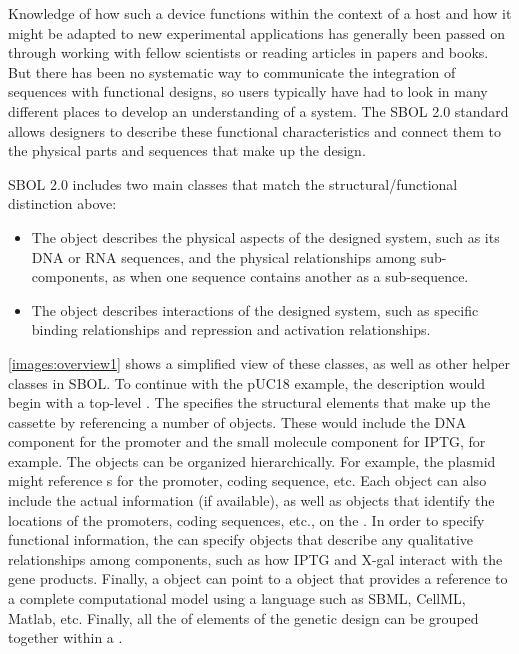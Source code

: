 Knowledge of how such a device functions within the context of a host and how it might be adapted to new experimental applications has generally been passed on through working with fellow scientists or reading articles in papers and books. 
But there has been no systematic way to communicate the integration of sequences with functional designs, so users typically have had to look in many different places to develop an understanding of a system.  
The SBOL 2.0 standard allows designers to describe these functional characteristics and connect them to the physical parts and sequences that make up the design. 

SBOL 2.0 includes two main classes that match the structural/functional distinction above:
\begin{itemize}
\item The  object describes the physical aspects of the designed system, such as its DNA or RNA sequences, and the physical relationships among sub-components, as when one sequence contains another as a sub-sequence.
\item The  object describes interactions of the designed system, such as specific binding relationships and repression and activation relationships. 
\end{itemize}

\ref{images:overview1} shows a simplified view of these classes, as well as other helper classes in SBOL. To continue with the pUC18 example, the description would begin with a top-level .  
The  specifies the structural elements that make up the cassette by referencing a number of  objects. These would include the DNA component for the promoter and the small molecule component for IPTG, for example.  
The  objects can be organized hierarchically.  
For example, the plasmid  might reference s for the promoter, coding sequence, etc.  
Each  object can also include the actual  information (if available), as well as  objects that identify the locations of the promoters, coding sequences, etc., on the .  
In order to specify functional information, the  can specify  objects that describe any qualitative relationships among components, such as how IPTG and X-gal interact with the gene products.  Finally, a  object can point to a  object that provides a reference to a complete computational model using a language such as SBML, CellML, Matlab, etc.  Finally, all the of elements of the genetic design can be grouped together within a .

